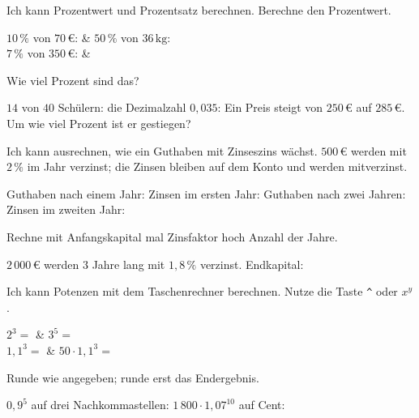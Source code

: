 \begin{aufgabe}{Ich kann Prozentwert und Prozentsatz berechnen. Berechne den Prozentwert.}
\begin{teilezwei}
\tz $10\,\%$ von $70\,€$: \leerfeld[€] & \tz $50\,\%$ von $36\,\text{kg}$: \leerfeld[kg] \\
\tz $7\,\%$ von $350\,€$: \leerfeld[€] & \\
\end{teilezwei}
Wie viel Prozent sind das?
\begin{teile}
\teil $14$ von $40$ Schülern: \leerfeld[\%]
\teil die Dezimalzahl $0{,}035$: \leerfeld[\%]
\teil Ein Preis steigt von $250\,€$ auf $285\,€$. Um wie viel Prozent ist er gestiegen? \quad \leerfeld[\%]
\end{teile}
\end{aufgabe}

\begin{aufgabe}{Ich kann ausrechnen, wie ein Guthaben mit Zinseszins wächst. $500\,€$ werden mit $2\,\%$ im Jahr verzinst; die Zinsen bleiben auf dem Konto und werden mitverzinst.}
\begin{teile}
\teil Guthaben nach einem Jahr: \leerfeld[€]
\teil Zinsen im ersten Jahr: \leerfeld[€]
\teil Guthaben nach zwei Jahren: \leerfeld[€]
\teil Zinsen im zweiten Jahr: \leerfeld[€]
\end{teile}
Rechne mit Anfangskapital mal Zinsfaktor hoch Anzahl der Jahre.
\begin{teile}
\teil $2\,000\,€$ werden $3$ Jahre lang mit $1{,}8\,\%$ verzinst. \quad Endkapital: \leerfeld[€]
\end{teile}
\end{aufgabe}

\begin{aufgabe}{Ich kann Potenzen mit dem Taschenrechner berechnen. Nutze die Taste \texttt{\^{}} oder $x^y$.}
\begin{teilezwei}
\tz $2^3 =$ \leerfeld & \tz $3^5 =$ \leerfeld \\
\tz $1{,}1^3 =$ \leerfeld & \tz $50 \cdot 1{,}1^3 =$ \leerfeld \\
\end{teilezwei}
Runde wie angegeben; runde erst das Endergebnis.
\begin{teile}
\teil $0{,}9^5$ auf drei Nachkommastellen: \leerfeld
\teil $1\,800 \cdot 1{,}07^{10}$ auf Cent: \leerfeld[€]
\end{teile}
\end{aufgabe}
